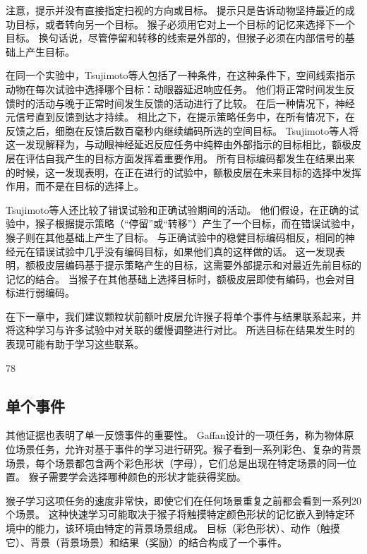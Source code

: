 注意，提示并没有直接指定扫视的方向或目标。
提示只是告诉动物坚持最近的成功目标，或者转向另一个目标。
猴子必须用它对上一个目标的记忆来选择下一个目标。
换句话说，尽管停留和转移的线索是外部的，但猴子必须在内部信号的基础上产生目标。\par


在同一个实验中，Tsujimoto等人包括了一种条件，在这种条件下，空间线索指示动物在每次试验中选择哪个目标：动眼器延迟响应任务。
他们将正常时间发生反馈时的活动与晚于正常时间发生反馈的活动进行了比较。
在后一种情况下，神经元信号直到反馈到达才持续。
相比之下，在提示策略任务中，在所有情况下，在反馈之后，细胞在反馈后数百毫秒内继续编码所选的空间目标。
Tsujimoto等人将这一发现解释为，与动眼神经延迟反应任务中纯粹由外部指示的目标相比，额极皮层在评估自我产生的目标方面发挥着重要作用。
所有目标编码都发生在结果出来的时候，这一发现表明，在正在进行的试验中，额极皮层在未来目标的选择中发挥作用，而不是在目标的选择上。\par


Tsujimoto等人还比较了错误试验和正确试验期间的活动。
他们假设，在正确的试验中，猴子根据提示策略（“停留”或“转移”）产生了一个目标，而在错误试验中，猴子则在其他基础上产生了目标。
与正确试验中的稳健目标编码相反，相同的神经元在错误试验中几乎没有编码目标，如果他们真的这样做的话。
这一发现表明，额极皮层编码基于提示策略产生的目标，这需要外部提示和对最近先前目标的记忆的结合。
当猴子在其他基础上选择目标时，额极皮层即使有编码，也会对目标进行弱编码。\par


在下一章中，我们建议颗粒状前额叶皮层允许猴子将单个事件与结果联系起来，并将这种学习与许多试验中对关联的缓慢调整进行对比。
所选目标在结果发生时的表现可能有助于学习这些联系。\par




78 \subsection{单个事件}

其他证据也表明了单一反馈事件的重要性。
Gaffan\cite{gaffan1992amnesia}设计的一项任务，称为物体原位场景任务，允许对基于事件的学习进行研究。猴子看到一系列彩色、复杂的背景场景，每个场景都包含两个彩色形状（字母），它们总是出现在特定场景的同一位置。
猴子需要学会选择哪种颜色的形状才能获得奖励。\par


猴子学习这项任务的速度非常快，即使它们在任何场景重复之前都会看到一系列20个场景。
这种快速学习可能取决于猴子将触摸特定颜色形状的记忆嵌入到特定环境中的能力，该环境由特定的背景场景组成。
目标（彩色形状）、动作（触摸它）、背景（背景场景）和结果（奖励）的结合构成了一个事件。\par


